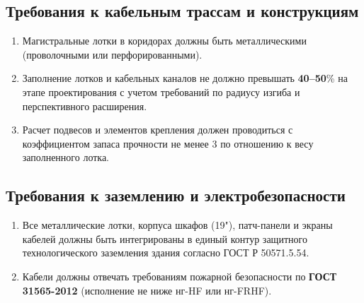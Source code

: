 \documentclass{bmstu}
\begin{document}
\begin{appendices}
\subsection{Требования к кабельным трассам и конструкциям}
\begin{enumerate}[label=\thesection.\arabic*]
    \item Магистральные лотки в коридорах должны быть металлическими (проволочными или перфорированными).
    \item Заполнение лотков и кабельных каналов не должно превышать \textbf{40--50}\% на этапе проектирования с учетом требований по радиусу изгиба и перспективного расширения.
    \item Расчет подвесов и элементов крепления должен проводиться с коэффициентом запаса прочности не менее 3 по отношению к весу заполненного лотка.
\end{enumerate}

\subsection{Требования к заземлению и электробезопасности}
\begin{enumerate}[label=\thesection.\arabic*]
    \item Все металлические лотки, корпуса шкафов (19"), патч-панели и экраны кабелей должны быть интегрированы в единый контур защитного технологического заземления здания согласно ГОСТ Р 50571.5.54.
    \item Кабели должны отвечать требованиям пожарной безопасности по \textbf{ГОСТ 31565-2012} (исполнение не ниже нг-HF или нг-FRHF).
\end{enumerate}



\end{appendices}
\end{document}
